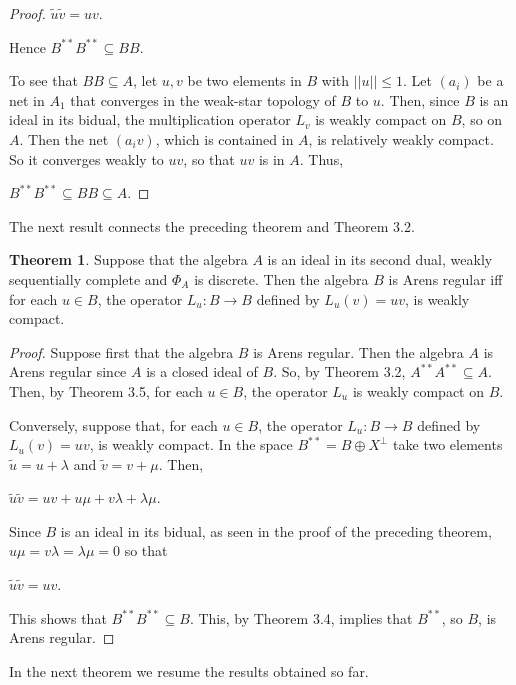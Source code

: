 \documentclass[12pt, twoside, leqno]{article}
\theoremstyle{definition}
\newtheorem{theorem}{Theorem}[section]
\theoremstyle{definition}
\numberwithin{equation}{section}
\begin{document}
\begin{proof}
	$ \tilde{u}\tilde{v}=uv$.\vspace{2mm}
	
	\noindent Hence $ B^{**}B^{**}\subseteq BB $.\vspace{ 2mm}
	
	To see that $ BB\subseteq A $, let $ u,v $ be two elements in $ B $ with $ ||u||\leq 1 $. Let $ (a_{i}) $ be a net in $ A_{1} $ that converges in the weak-star topology of $ B $ to $ u $. Then, since $ B $ is an ideal in its bidual, the multiplication operator $ L_{v} $ is weakly compact on $ B $, so on $ A $. Then the net $ (a_{i}v) $, which is contained in $ A $, is relatively weakly compact. So it converges weakly to $ uv $, so that $ uv $ is in $ A $. Thus,\vspace{2mm}
	
	$ B^{**}B^{**}\subseteq BB\subseteq A $.
	\end{proof}
The next result connects the preceding theorem and Theorem 3.2.

\begin{theorem}
	Suppose that the algebra $ A $ is an ideal in its second dual, weakly sequentially complete and $ \Phi_{A} $ is discrete. Then the algebra $ B $ is Arens regular iff for each $ u\in B $, the operator $ L_{u}:B\rightarrow B $ defined by $ L_{u}(v)=uv $, is weakly compact.
\end{theorem}
\begin{proof}
	Suppose first that the algebra $ B $ is Arens regular. Then the algebra $ A $ is Arens regular since $ A $ is a closed ideal of $ B $. So, by Theorem 3.2, $ A^{**}A^{**}\subseteq A $. Then, by Theorem 3.5, for each $ u\in B $, the operator $ L_{u} $ is weakly compact on $ B $.\vspace{2mm}
	
	Conversely, suppose that, for each $ u\in B $, the operator $ L_{u}:B\rightarrow B $ defined by $ L_{u}(v)=uv $, is weakly compact. In the space $ B^{**}=B\oplus X^{\perp} $ take two elements $ \tilde{u}=u+\lambda $ and $ \tilde{v}=v+\mu $. Then, \vspace{3mm}
	
	$ \tilde{ u}\tilde{v}=uv+u\mu+v\lambda+\lambda \mu $.\vspace{3mm}
	
	\noindent Since $ B $ is an ideal in its bidual, as seen in the proof of the preceding theorem, $u\mu=v\lambda=\lambda \mu=0   $ so that \vspace{2mm}
	
		$ \tilde{ u}\tilde{v}=uv $.\vspace{2mm}
		
		\noindent This shows that $ B^{**}B^{**}\subseteq B $. This, by Theorem 3.4, implies that $ B^{**} $, so $ B $, is Arens regular.
\end{proof}
In the next theorem we resume the results obtained so far.
\end{document}
